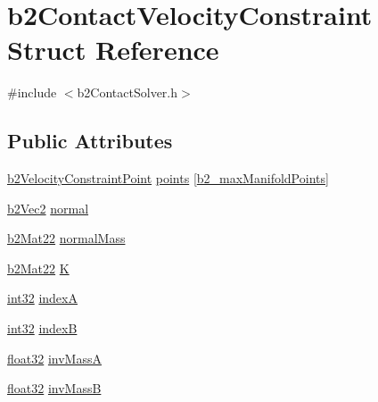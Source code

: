 \hypertarget{structb2_contact_velocity_constraint}{}\section{b2\+Contact\+Velocity\+Constraint Struct Reference}
\label{structb2_contact_velocity_constraint}


{\ttfamily \#include $<$b2\+Contact\+Solver.\+h$>$}

\subsection*{Public Attributes}
\begin{DoxyCompactItemize}
\item 
\mbox{\hyperlink{structb2_velocity_constraint_point}{b2\+Velocity\+Constraint\+Point}} \mbox{\hyperlink{structb2_contact_velocity_constraint_a549a4b6f915af5516234ece57b60e0dd}{points}} \mbox{[}\mbox{\hyperlink{b2_settings_8h_aa5f44cc9edf711433dea2b2ec94f3c42}{b2\+\_\+max\+Manifold\+Points}}\mbox{]}
\item 
\mbox{\hyperlink{structb2_vec2}{b2\+Vec2}} \mbox{\hyperlink{structb2_contact_velocity_constraint_a1da730d689f89bd89cab06c5792f9bf3}{normal}}
\item 
\mbox{\hyperlink{structb2_mat22}{b2\+Mat22}} \mbox{\hyperlink{structb2_contact_velocity_constraint_a0ee46cdf9b9136484e6a2ca25ac7cd4b}{normal\+Mass}}
\item 
\mbox{\hyperlink{structb2_mat22}{b2\+Mat22}} \mbox{\hyperlink{structb2_contact_velocity_constraint_a36c427f978d6f390552220b8ad21e1a9}{K}}
\item 
\mbox{\hyperlink{b2_settings_8h_a43d43196463bde49cb067f5c20ab8481}{int32}} \mbox{\hyperlink{structb2_contact_velocity_constraint_a44a5ddedc5058c2453e873b999acd547}{indexA}}
\item 
\mbox{\hyperlink{b2_settings_8h_a43d43196463bde49cb067f5c20ab8481}{int32}} \mbox{\hyperlink{structb2_contact_velocity_constraint_a55a9fd87a6e560fe83d81d6b9c14f356}{indexB}}
\item 
\mbox{\hyperlink{b2_settings_8h_aacdc525d6f7bddb3ae95d5c311bd06a1}{float32}} \mbox{\hyperlink{structb2_contact_velocity_constraint_a529003546429532d186130ca35f2178e}{inv\+MassA}}
\item 
\mbox{\hyperlink{b2_settings_8h_aacdc525d6f7bddb3ae95d5c311bd06a1}{float32}} \mbox{\hyperlink{structb2_contact_velocity_constraint_ac75c816e94402ed4d93f232d211d4f62}{inv\+MassB}}
\item 

\end{DoxyCompactItemize}
